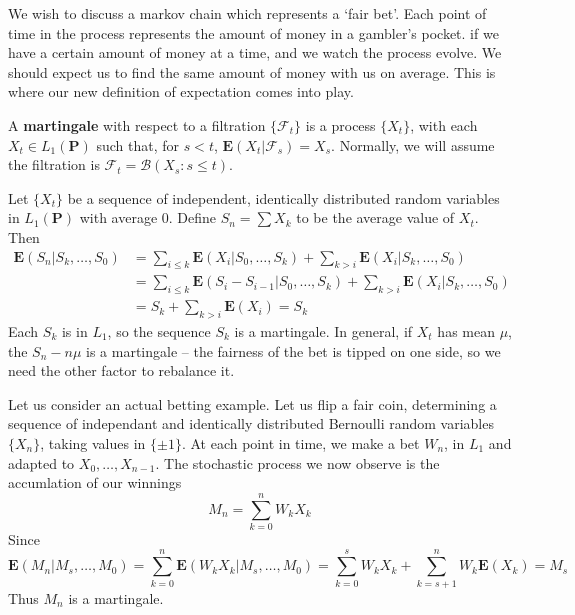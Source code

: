 We wish to discuss a markov chain which represents a `fair bet'. Each point of time in the process represents the amount of money in a gambler's pocket. if we have a certain amount of money at a time, and we watch the process evolve. We should expect us to find the same amount of money with us on average. This is where our new definition of expectation comes into play.

\begin{definition}
    A {\bf martingale} with respect to a filtration $\{ \mathcal{F}_t \}$ is a process $\{X_t\}$, with each $X_t \in L_1(\mathbf{P})$ such that, for $s < t$, $\mathbf{E}(X_t | \mathcal{F}_s) = X_s$. Normally, we will assume the filtration is $\mathcal{F}_t = \mathcal{B}(X_s : s \leq t)$.
\end{definition}

\begin{example}
    Let $\{ X_t \}$ be a sequence of independent, identically distributed random variables in $L_1(\mathbf{P})$ with average 0. Define $S_n = \sum X_k$ to be the average value of $X_t$. Then
    \begin{align*}
        \mathbf{E}(S_n | S_k, \dots, S_0) &= \sum_{i \leq k} \mathbf{E}(X_i | S_0, \dots, S_k) + \sum_{k > i} \mathbf{E}(X_i | S_k, \dots, S_0)\\
        &= \sum_{i \leq k} \mathbf{E}(S_{i} - S_{i-1} | S_0, \dots, S_k) + \sum_{k > i} \mathbf{E}(X_i | S_k, \dots, S_0)\\
        &= S_k + \sum_{k > i} \mathbf{E}(X_i) = S_k
    \end{align*}
    Each $S_k$ is in $L_1$, so the sequence $S_k$ is a martingale. In general, if $X_t$ has mean $\mu$, the $S_n - n \mu$ is a martingale -- the fairness of the bet is tipped on one side, so we need the other factor to rebalance it.
\end{example}

\begin{example}
    Let us consider an actual betting example. Let us flip a fair coin, determining a sequence of independant and identically distributed Bernoulli random variables $\{ X_n \}$, taking values in $\{ \pm 1 \}$. At each point in time, we make a bet $W_n$, in $L_1$ and adapted to $X_0, \dots, X_{n-1}$. The stochastic process we now observe is the accumlation of our winnings
    \[ M_n = \sum_{k = 0}^n W_k X_k \]
    Since
    \[ \mathbf{E}(M_n | M_s, \dots, M_0) = \sum_{k = 0}^n \mathbf{E}(W_k X_k | M_s, \dots, M_0) = \sum_{k = 0}^s W_k X_k + \sum_{k = s+1}^n W_k \mathbf{E}(X_k) = M_s \]
    Thus $M_n$ is a martingale.
\end{example}

